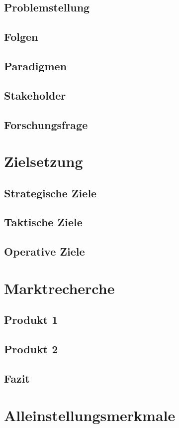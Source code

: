 \documentclass[12pt,titlepage]{scrartcl}
\begin{document}
		\subsection{Problemstellung}
		\subsection{Folgen}
		\subsection{Paradigmen}
		\subsection{Stakeholder}
		\subsection{Forschungsfrage}
	\newpage	
	\section{Zielsetzung}
		\subsection{Strategische Ziele}
		\subsection{Taktische Ziele}
		\subsection{Operative Ziele}
	\newpage	
	\section{Marktrecherche}
		\subsection{Produkt 1}
		\subsection{Produkt 2}
		\subsection{Fazit}
	\newpage
	\section{Alleinstellungsmerkmale}	
	
\end{document}
